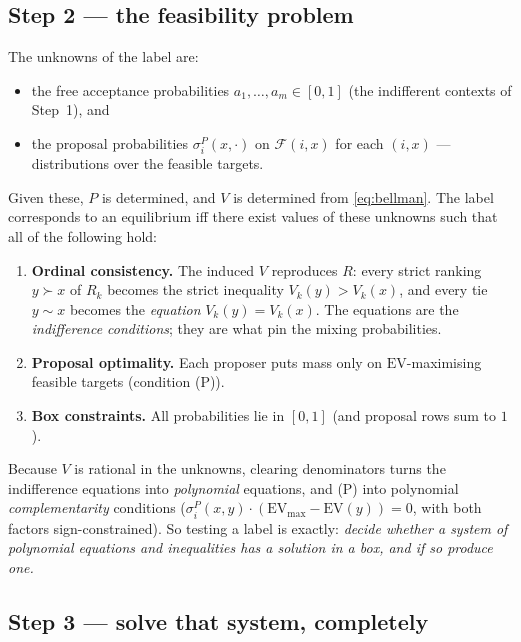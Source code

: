 \documentclass[11pt]{article}
\begin{document}
\subsection{Step 2 --- the feasibility problem}
The unknowns of the label are:
\begin{itemize}[nosep]
\item the free acceptance probabilities $a_1,\dots,a_m\in[0,1]$ (the indifferent
contexts of Step~1), and
\item the proposal probabilities $\sigma^P_i(x,\cdot)$ on $\mathcal{F}(i,x)$ for each
$(i,x)$ --- distributions over the feasible targets.
\end{itemize}
Given these, $P$ is determined, and $V$ is determined from \eqref{eq:bellman}. The
label corresponds to an equilibrium iff there exist values of these unknowns such
that all of the following hold:
\begin{enumerate}[nosep,label=(\roman*)]
\item \textbf{Ordinal consistency.} The induced $V$ reproduces $R$: every strict
ranking $y\succ x$ of $R_k$ becomes the strict inequality $V_k(y)>V_k(x)$, and every
tie $y\sim x$ becomes the \emph{equation} $V_k(y)=V_k(x)$. The equations are the
\emph{indifference conditions}; they are what pin the mixing probabilities.
\item \textbf{Proposal optimality.} Each proposer puts mass only on
$\mathrm{EV}$-maximising feasible targets (condition (P)).
\item \textbf{Box constraints.} All probabilities lie in $[0,1]$ (and proposal rows
sum to $1$).
\end{enumerate}
Because $V$ is rational in the unknowns, clearing denominators turns the indifference
equations into \emph{polynomial} equations, and (P) into polynomial
\emph{complementarity} conditions ($\sigma^P_i(x,y)\cdot(\mathrm{EV}_{\max}-
\mathrm{EV}(y))=0$, with both factors sign-constrained). So testing a label is
exactly: \emph{decide whether a system of polynomial equations and inequalities has a
solution in a box, and if so produce one.}

\subsection{Step 3 --- solve that system, completely}
\end{document}
